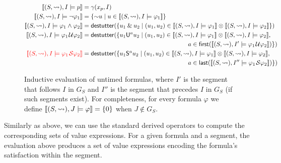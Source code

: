 \begin{figure*}[!t]
	\begin{align*}
		\llbracket (S, {\hb}), I \models p \rrbracket &= \gamma(x_p, I) \\
		\llbracket (S, {\hb}), I \models \lnot \varphi_1 \rrbracket &= \{\BitNeg u \st u \in  \llbracket (S, {\hb}), I \models \varphi_1 \rrbracket \} \\
		\llbracket (S, {\hb}), I \models \varphi_1 \land \varphi_2 \rrbracket &= \destutter(\{ u_1 \BitAnd u_2 \st (u_1, u_2) \in \llbracket (S, {\hb}), I \models \varphi_1 \rrbracket \otimes \llbracket (S, {\hb}), I \models \varphi_2 \rrbracket  \}) \\
		\llbracket (S, {\hb}), I \models \varphi_1 \until \varphi_2 \rrbracket &= \destutter(\{ u_1 \mathsf{U}^a u_2 \st (u_1, u_2) \in \llbracket (S, {\hb}), I \models \varphi_1 \rrbracket \otimes \llbracket (S, {\hb}), I \models \varphi_2 \rrbracket, \\
		&\hspace{17em} a \in \first(\llbracket (S, {\hb}), I' \models \varphi_1 \until \varphi_2 \rrbracket) \}) \\
		\bgroup \color{red}\llbracket (S, {\hb}), I \models \varphi_1 \since \varphi_2 \rrbracket \egroup &= \destutter(\{ u_1 \mathsf{S}^a u_2 \st (u_1, u_2) \in \llbracket (S, {\hb}), I \models \varphi_1 \rrbracket \otimes \llbracket (S, {\hb}), I \models \varphi_2 \rrbracket, \\
		&\hspace{17em} a \in \last(\llbracket (S, {\hb}), I'' \models \varphi_1 \since \varphi_2 \rrbracket) \})
	\end{align*}
	\caption{Inductive evaluation of untimed formulas, where $I'$ is the segment that follows $I$ in $G_S$  and  $I''$ is the segment that precedes $I$ in $G_S$ (if such segments exist). For completeness, for every formula $\varphi$ we define $\llbracket (S, {\rightsquigarrow}), J \models \varphi \rrbracket = \{0\}$ when $J \notin G_S$. \label{fig:eval}}
\end{figure*}

Similarly as above, we can use the standard derived operators to compute the corresponding sets of value expressions.
For a given formula and a segment, the evaluation above produces a set of value expressions encoding the formula's satisfaction within the segment.

